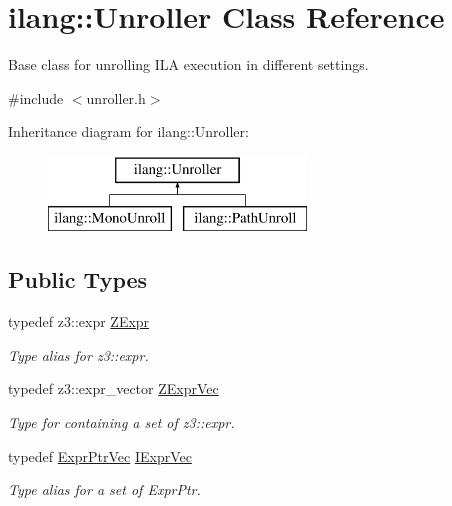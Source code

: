 \hypertarget{classilang_1_1_unroller}{}\section{ilang\+:\+:Unroller Class Reference}
\label{classilang_1_1_unroller}


Base class for unrolling I\+LA execution in different settings.  




{\ttfamily \#include $<$unroller.\+h$>$}

Inheritance diagram for ilang\+:\+:Unroller\+:\begin{figure}[H]
\begin{center}
\leavevmode
\includegraphics[height=2.000000cm]{classilang_1_1_unroller}
\end{center}
\end{figure}
\subsection*{Public Types}
\begin{DoxyCompactItemize}
\item 
\mbox{\label{classilang_1_1_unroller_a9fd0359e3ffd666f8f92ad3c3ef52673}} 
typedef z3\+::expr \mbox{\hyperlink{classilang_1_1_unroller_a9fd0359e3ffd666f8f92ad3c3ef52673}{Z\+Expr}}
\begin{DoxyCompactList}\small\item\em Type alias for z3\+::expr. \end{DoxyCompactList}\item 
\mbox{\label{classilang_1_1_unroller_a528c82cb66ed4f9a62e805ebbc8aef19}} 
typedef z3\+::expr\+\_\+vector \mbox{\hyperlink{classilang_1_1_unroller_a528c82cb66ed4f9a62e805ebbc8aef19}{Z\+Expr\+Vec}}
\begin{DoxyCompactList}\small\item\em Type for containing a set of z3\+::expr. \end{DoxyCompactList}\item 
\mbox{\label{classilang_1_1_unroller_a60a486a0b0e6d269ce6507725708c22a}} 
typedef \mbox{\hyperlink{namespaceilang_a95d222bcc4d46261cbf6dbc18a3f5e11}{Expr\+Ptr\+Vec}} \mbox{\hyperlink{classilang_1_1_unroller_a60a486a0b0e6d269ce6507725708c22a}{I\+Expr\+Vec}}
\begin{DoxyCompactList}\small\item\em Type alias for a set of Expr\+Ptr. \end{DoxyCompactList}\end{DoxyCompactItemize}
